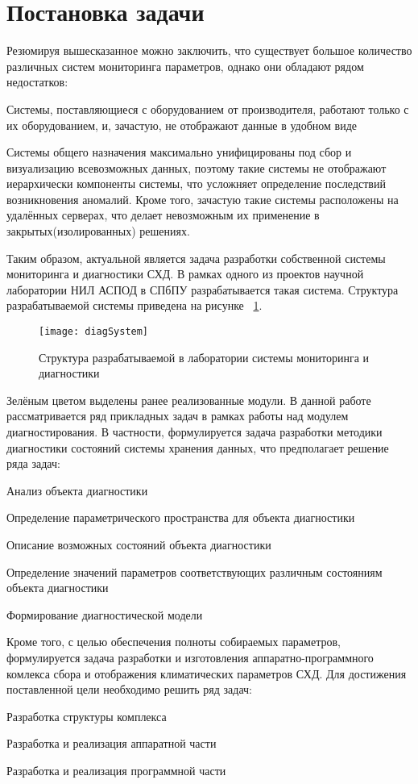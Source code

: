 \section{Постановка задачи}

Резюмируя вышесказанное можно заключить, что существует большое количество различных систем мониторинга параметров, однако они обладают рядом недостатков:
\begin{itemize*}
	\item{Системы, поставляющиеся с оборудованием от производителя, работают только с их оборудованием, и, зачастую, не отображают данные в удобном виде}
	\item{Системы общего назначения максимально унифицированы под сбор и визуализацию всевозможных данных, поэтому такие системы не отображают иерархически компоненты системы, что усложняет определение последствий возникновения аномалий.  Кроме того, зачастую такие системы расположены на удалённых серверах, что делает невозможным их применение в закрытых(изолированных) решениях.}
\end{itemize*}

Таким образом, актуальной является задача разработки собственной системы мониторинга и диагностики СХД. В рамках одного из проектов научной лаборатории НИЛ АСПОД в СПбПУ разрабатывается такая система. Структура разрабатываемой системы приведена на рисунке ~\ref{fig:diagSystem}.
\begin{figure}[!h]
	\centering
	\texttt{[image: diagSystem]}
	\caption{Структура разрабатываемой в лаборатории системы мониторинга и диагностики}
	\label{fig:diagSystem}
\end{figure}

Зелёным цветом выделены ранее реализованные модули.
В данной работе рассматривается ряд прикладных задач в рамках работы над модулем диагностирования. В частности, формулируется задача разработки методики диагностики состояний системы хранения данных, что предполагает решение ряда задач:
\begin{itemize*}
	\item{Анализ объекта диагностики}
	\item{Определение параметрического пространства для объекта диагностики}
	\item{Описание возможных состояний объекта диагностики}
	\item{Определение значений параметров соответствующих различным состояниям объекта диагностики}
	\item{Формирование диагностической модели}
\end{itemize*}
Кроме того, с целью обеспечения полноты собираемых параметров, формулируется задача разработки и изготовления аппаратно-программного комлекса сбора и отображения климатических параметров СХД. Для достижения поставленной цели необходимо решить ряд задач: 
\begin{itemize*}
	\item{Разработка структуры комплекса}
	\item{Разработка и реализация аппаратной части}
	\item{Разработка и реализация программной части}
\end{itemize*}	 

